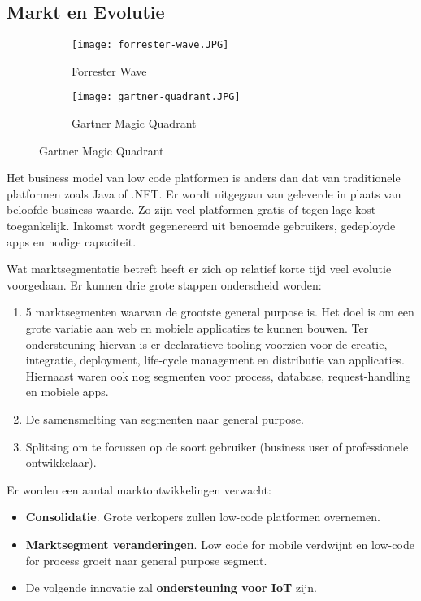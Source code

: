 \subsection{Markt en Evolutie}
\label{sec:markt-en-evolutie}

\begin{figure}[h!]
    \centering
    \begin{subfigure}[b]{0.4\linewidth}
        \texttt{[image: forrester-wave.JPG]}
        \caption{Forrester Wave \autocite{Rymer2019}}
    \end{subfigure}
    \begin{subfigure}[b]{0.4\linewidth}
        \texttt{[image: gartner-quadrant.JPG]}
        \caption{Gartner Magic Quadrant \autocite{Vincent2019}}
    \end{subfigure}
    \label{fig:quadwave}
\end{figure}

Het business model van low code platformen is anders dan dat van traditionele platformen zoals Java of .NET. Er wordt uitgegaan van geleverde in plaats van beloofde business waarde. Zo zijn veel platformen gratis of tegen lage kost toegankelijk. Inkomst wordt gegenereerd uit benoemde gebruikers, gedeployde apps en nodige capaciteit. \autocite{Richardson2016}

Wat marktsegmentatie betreft heeft er zich op relatief korte tijd veel evolutie voorgedaan. Er kunnen drie grote stappen onderscheid worden:
\begin{enumerate}
    \item 5 marktsegmenten waarvan de grootste general purpose is. Het doel is om een grote variatie aan web en mobiele applicaties te kunnen bouwen. Ter ondersteuning hiervan is er declaratieve tooling voorzien voor de creatie, integratie, deployment, life-cycle management en distributie van applicaties. Hiernaast waren ook nog segmenten voor process, database, request-handling en mobiele apps.
    \item De samensmelting van segmenten naar general purpose. %
    \item Splitsing om te focussen op de soort gebruiker (business user of professionele ontwikkelaar). %
\end{enumerate}

Er worden een aantal marktontwikkelingen verwacht:
\begin{itemize}
    \item \textbf{Consolidatie}. Grote verkopers zullen low-code platformen overnemen.
    \item \textbf{Marktsegment veranderingen}. Low code for mobile verdwijnt en low-code for process groeit naar general purpose segment.
    \item De volgende innovatie zal \textbf{ondersteuning voor IoT} zijn.
\end{itemize} \autocite{Richardson2016}

